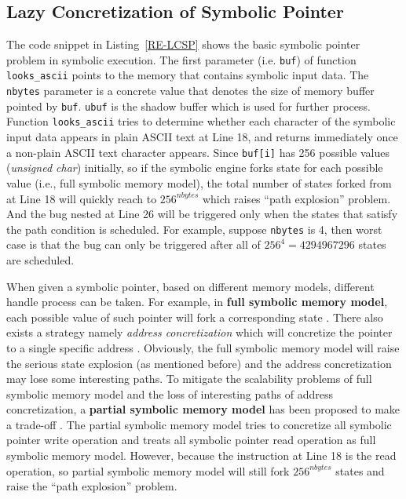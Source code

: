 \subsection{Lazy Concretization of Symbolic Pointer}
The code snippet in Listing~\ref{RE-LCSP} shows the basic symbolic pointer problem in symbolic execution. 
The first parameter (i.e. \texttt{buf}) of function \texttt{looks\_ascii} points to the memory that contains symbolic input data. The \texttt{nbytes} parameter is a concrete value that denotes the size of memory buffer pointed by \texttt{buf}. \texttt{ubuf} is the shadow buffer which is used for further process. 
Function \texttt{looks\_ascii} tries to determine whether each character of the symbolic input data appears in plain ASCII text at Line 18, and returns immediately once a non-plain ASCII text character appears. 
Since \texttt{buf[i]} has 256 possible values (\textit{unsigned char}) initially, so if the symbolic engine forks state for each possible value (i.e., full symbolic memory model), the total number of states forked from at Line 18 will quickly reach to $256^{nbytes}$ which raises ``path explosion'' problem. And the bug nested at Line 26 will be triggered only when the states that satisfy the path condition is scheduled. For example, suppose \texttt{nbytes} is 4, then worst case is that the bug can only be triggered after all of $256^4=4294967296$ states are scheduled.

When given a symbolic pointer, based on different memory models, different handle process can be taken. For example, in \textbf{full symbolic memory model}, each possible value of such pointer will fork a corresponding state \cite{song2008bitblaze, thakur2010directed, brumley2011bap, trtik2014symbolic}. There also exists a strategy namely \textit{address concretization} which will concretize the pointer to a single specific address \cite{godefroid2005dart, burnim2008heuristics}. Obviously, the full symbolic memory model will raise the serious state explosion (as mentioned before) and the address concretization may lose some interesting paths. To mitigate the scalability problems of full symbolic memory model and the loss of interesting paths of address concretization, a \textbf{partial symbolic memory model} has been proposed to make a trade-off \cite{cha2012unleashing, avgerinos2014exploiting, Shoshitaishvili_firmalice-automatic}. The partial symbolic memory model tries to concretize all symbolic pointer write operation and treats all symbolic pointer read operation as full symbolic memory model. However, because the instruction at Line 18 is the read operation, so partial symbolic memory model will still fork $256^{nbytes}$ states and raise the ``path explosion'' problem.

